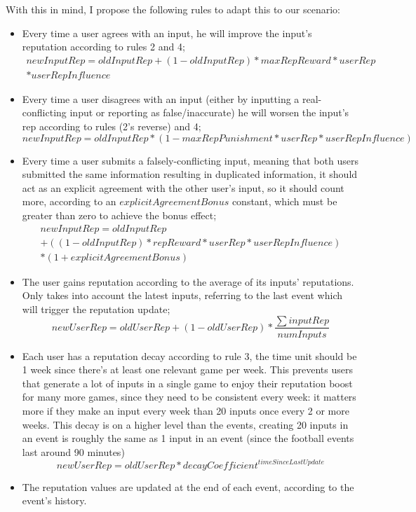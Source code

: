 With this in mind, I propose the following rules to adapt this to our scenario:

\begin{itemize}
    \item Every time a user agrees with an input, he will improve the input's reputation according to rules 2 and 4;
    \begin{multline}
        newInputRep = oldInputRep + (1 - oldInputRep) * maxRepReward * userRep\\ * userRepInfluence
    \end{multline}
    \item Every time a user disagrees with an input (either by inputting a real-conflicting input or reporting as false/inaccurate) he will worsen the input's rep according to rules (2's reverse) and 4;
    \begin{equation}
        newInputRep = oldInputRep * (1 - maxRepPunishment * userRep * userRepInfluence)
    \end{equation}
    \item Every time a user submits a falsely-conflicting input, meaning that both users submitted the same information resulting in duplicated information, it should act as an explicit agreement with the other user's input, so it should count more, according to an $explicitAgreementBonus$ constant, which must be greater than zero to achieve the bonus effect;
    \begin{multline}
    newInputRep = oldInputRep \\+ ((1 - oldInputRep) * repReward * userRep * userRepInfluence)\\ * (1 + explicitAgreementBonus)
    \end{multline}
    \item The user gains reputation according to the average of its inputs' reputations. Only takes into account the latest inputs, referring to the last event which will trigger the reputation update;
    \begin{equation}
        newUserRep = oldUserRep + (1 - oldUserRep) * \frac{\sum inputRep}{numInputs}
    \end{equation}
    \item Each user has a reputation decay according to rule 3, the time unit should be 1 week since there's at least one relevant game per week. This prevents users that generate a lot of inputs in a single game to enjoy their reputation boost for many more games, since they need to be consistent every week: it matters more if they make an input every week than 20 inputs once every 2 or more weeks.
    This decay is on a higher level than the events, creating 20 inputs in an event is roughly the same as 1 input in an event (since the football events last around 90 minutes)
    \begin{equation}
        newUserRep = oldUserRep * decayCoefficient^{timeSinceLastUpdate}
    \end{equation}
    \item The reputation values are updated at the end of each event, according to the event's history.
\end{itemize}


